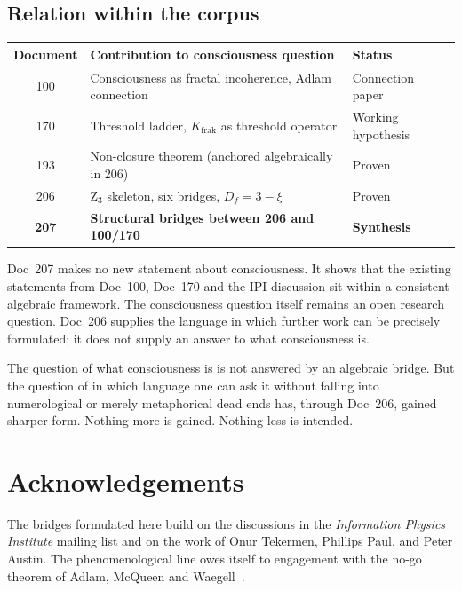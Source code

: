 \subsection{Relation within the corpus}

\begin{center}
\begin{tabular}{c|p{8cm}|l}
\textbf{Document} & \textbf{Contribution to consciousness question} & \textbf{Status} \\
\hline
100 & Consciousness as fractal incoherence, Adlam connection & Connection paper \\
170 & Threshold ladder, $K_{\text{frak}}$ as threshold operator & Working hypothesis \\
193 & Non-closure theorem (anchored algebraically in 206) & Proven \\
206 & Z$_3$ skeleton, six bridges, $D_f = 3 - \xi$ & Proven \\
\textbf{207} & \textbf{Structural bridges between 206 and 100/170} & \textbf{Synthesis} \\
\end{tabular}
\end{center}

Doc~207 makes no new statement about consciousness. It shows that the existing statements from Doc~100, Doc~170 and the IPI discussion sit within a consistent algebraic framework. The consciousness question itself remains an open research question. Doc~206 supplies the language in which further work can be precisely formulated; it does not supply an answer to what consciousness is.

\begin{philosophical}[Closing]
The question of what consciousness is is not answered by an algebraic bridge. But the question of in which language one can ask it without falling into numerological or merely metaphorical dead ends has, through Doc~206, gained sharper form. Nothing more is gained. Nothing less is intended.
\end{philosophical}

\section*{Acknowledgements}

The bridges formulated here build on the discussions in the \emph{Information Physics Institute} mailing list and on the work of Onur Tekermen, Phillips Paul, and Peter Austin. The phenomenological line owes itself to engagement with the no-go theorem of Adlam, McQueen and Waegell~\cite{Adlam2025}.

